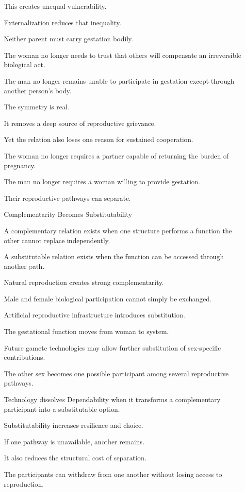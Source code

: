 This creates unequal vulnerability.

Externalization reduces that inequality.

Neither parent must carry gestation bodily.

The woman no longer needs to trust that others will compensate an irreversible biological act.

The man no longer remains unable to participate in gestation except through another person’s body.

The symmetry is real.

It removes a deep source of reproductive grievance.

Yet the relation also loses one reason for sustained cooperation.

The woman no longer requires a partner capable of returning the burden of pregnancy.

The man no longer requires a woman willing to provide gestation.

Their reproductive pathways can separate.

Complementarity Becomes Substitutability

A complementary relation exists when one structure performs a function the other cannot replace independently.

A substitutable relation exists when the function can be accessed through another path.

Natural reproduction creates strong complementarity.

Male and female biological participation cannot simply be exchanged.

Artificial reproductive infrastructure introduces substitution.

The gestational function moves from woman to system.

Future gamete technologies may allow further substitution of sex-specific contributions.

The other sex becomes one possible participant among several reproductive pathways.

Technology dissolves Dependability when it transforms a complementary participant into a substitutable option.

Substitutability increases resilience and choice.

If one pathway is unavailable, another remains.

It also reduces the structural cost of separation.

The participants can withdraw from one another without losing access to reproduction.

